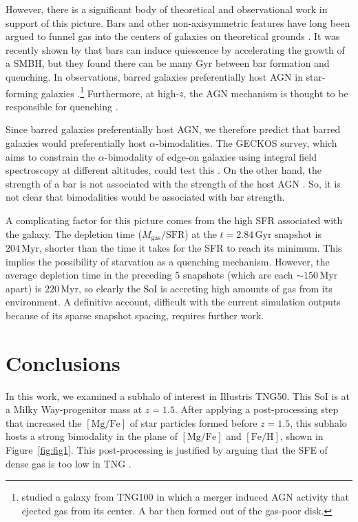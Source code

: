 \documentclass[twocolumn]{aastex631}
\newcommand{\Gyr}{\ensuremath{\textrm{Gyr}}}
\newcommand{\Myr}{\ensuremath{\textrm{Myr}}}
\newcommand{\FeH}{\ensuremath{[\textrm{Fe}/\textrm{H}]}}
\newcommand{\MgFe}{\ensuremath{[\textrm{Mg}/\textrm{Fe}]}}
\begin{document}
However, there is a significant body of theoretical and observational work in support of this picture. Bars and other non-axisymmetric features have long been argued to funnel gas into the centers of galaxies on theoretical grounds \citep{1989Natur.338...45S,2010MNRAS.407.1529H}. It was recently shown by \citet{2024arXiv240906783F} that bars can induce quiescence by accelerating the growth of a SMBH, but they found there can be many Gyr between bar formation and quenching. In observations, barred galaxies preferentially host AGN in star-forming galaxies \citep{2012ApJS..198....4O,2022A&A...661A.105S}.\footnote{\citet{2022A&A...668L...3L} studied a galaxy from TNG100 in which a merger induced AGN activity that ejected gas from its center. A bar then formed out of the gas-poor disk.} Furthermore, at high-$z$, the AGN mechanism is thought to be responsible for quenching \citep[e.g.][and references therein]{2023arXiv230806317D,2024arXiv240417945P,2024arXiv240518685M,2024Natur.630...54B}.

Since barred galaxies preferentially host AGN, we therefore predict that barred galaxies would preferentially host $\alpha$-bimodalities. The GECKOS survey, which aims to constrain the $\alpha$-bimodality of edge-on galaxies using integral field spectroscopy at different altitudes, could test this \citep{2024IAUS..377...27V}. On the other hand, the strength of a bar is not associated with the strength of the host AGN \citep[e.g.]{2022A&A...661A.105S}. So, it is not clear that bimodalities would be associated with bar strength.

A complicating factor for this picture comes from the high SFR associated with the galaxy. The depletion time ($M_{\textrm{gas}}/\textrm{SFR}$) at the $t=2.84\,\Gyr$ snapshot is $204\,\Myr$, shorter than the time it takes for the SFR to reach its minimum. This implies the possibility of starvation as a quenching mechanism. However, the average depletion time in the preceding 5 snapshots (which are each $\sim150\,\Myr$ apart) is $220\,\Myr$, so clearly the SoI is accreting high amounts of gas from its environment. A definitive account, difficult with the current simulation outputs because of its sparse snapshot spacing, requires further work.

\section{Conclusions}\label{sec:conc}
In this work, we examined a subhalo of interest in Illustris TNG50. This SoI is at a Milky Way-progenitor mass at $z=1.5$. After applying a post-processing step that increased the \MgFe{} of star particles formed before $z=1.5$, this subhalo hosts a strong bimodality in the plane of \MgFe{} and \FeH{}, shown in Figure~\ref{fig:fig1}. This post-processing is justified by arguing that the SFE of dense gas is too low in TNG \citep[][see discussion in our Section~\ref{ssec:sfe}]{2024arXiv240909121H}.
\end{document}
